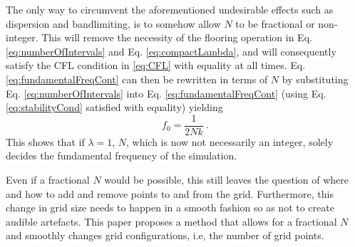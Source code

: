 The only way to circumvent the aforementioned undesirable effects such as dispersion and bandlimiting, is to somehow allow $N$ to be fractional or non-integer. This will remove the necessity of the flooring operation in Eq. \eqref{eq:numberOfIntervals} and Eq. \eqref{eq:compactLambda}, and will consequently satisfy the CFL condition in \eqref{eq:CFL} with equality at all times. Eq. \eqref{eq:fundamentalFreqCont} can then be rewritten in terms of $N$ by substituting Eq. \eqref{eq:numberOfIntervals} into Eq. \eqref{eq:fundamentalFreqCont} (using Eq. \eqref{eq:stabilityCond} satisfied with equality) yielding
\begin{equation}\label{eq:fundamentalFreq}
    f_0 = \frac{1}{2Nk}\ .
\end{equation}
This shows that if $\lambda = 1$, $N$, which is now not necessarily an integer, solely decides the fundamental frequency of the simulation. 

Even if a fractional $N$ would be possible, this still leaves the question of where and how to add and remove points to and from the grid. Furthermore, this change in grid size needs to happen in a smooth fashion so as not to create audible artefacts. 
This paper proposes a method that allows for a fractional $N$ and smoothly changes grid configurations, i.e, the number of grid points. %



